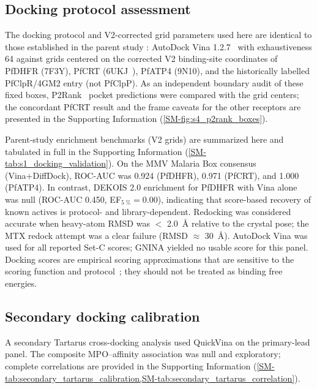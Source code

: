 \documentclass[journal=jcisd8,manuscript=article,layout=traditional]{achemso}
\begin{document}
\subsection{Docking protocol assessment}

The docking protocol and V2-corrected grid parameters used here are identical to those established in the parent study \citep{temgoua2026chemrxiv}: AutoDock Vina 1.2.7~\citep{vina_2021} with exhaustiveness \num{64} against grids centered on the corrected V2 binding-site coordinates of PfDHFR (7F3Y), PfCRT (6UKJ~\citep{Kim2019PfCRT}), PfATP4 (9N10), and the historically labelled PfClpR/4GM2 entry (not PfClpP). As an independent boundary audit of these fixed boxes, P2Rank~\citep{Krivak2018P2Rank} pocket predictions were compared with the grid centers; the concordant PfCRT result and the frame caveats for the other receptors are presented in the Supporting Information (\cref{SM-fig:s4_p2rank_boxes}).

Parent-study enrichment benchmarks (V2 grids) are summarized here and tabulated in full in the Supporting Information (\cref{SM-tab:s1_docking_validation}). On the MMV Malaria Box consensus (Vina+DiffDock), ROC-AUC was \num{0.924} (PfDHFR), \num{0.971} (PfCRT), and \num{1.000} (PfATP4). In contrast, DEKOIS 2.0 enrichment for PfDHFR with Vina alone was null (ROC-AUC \num{0.450}, EF$_{\qty{5}{\percent}}=\num{0.00}$), indicating that score-based recovery of known actives is protocol- and library-dependent. Redocking was considered accurate when heavy-atom RMSD was $<$ \qty{2.0}{\angstrom} relative to the crystal pose; the MTX redock attempt was a clear failure (RMSD $\approx$ \qty{30}{\angstrom}). AutoDock Vina was used for all reported Set-C scores; GNINA yielded no usable score for this panel. Docking scores are empirical scoring approximations that are sensitive to the scoring function and protocol~\citep{ferreira2023docking,sadybekov2023computational,kittelson2026docking}; they should not be treated as binding free energies.

\subsection{Secondary docking calibration}

A secondary Tartarus cross-docking analysis used QuickVina on the primary-lead panel. The composite MPO--affinity association was null and exploratory; complete correlations are provided in the Supporting Information (\cref{SM-tab:secondary_tartarus_calibration,SM-tab:secondary_tartarus_correlation}).
\end{document}
